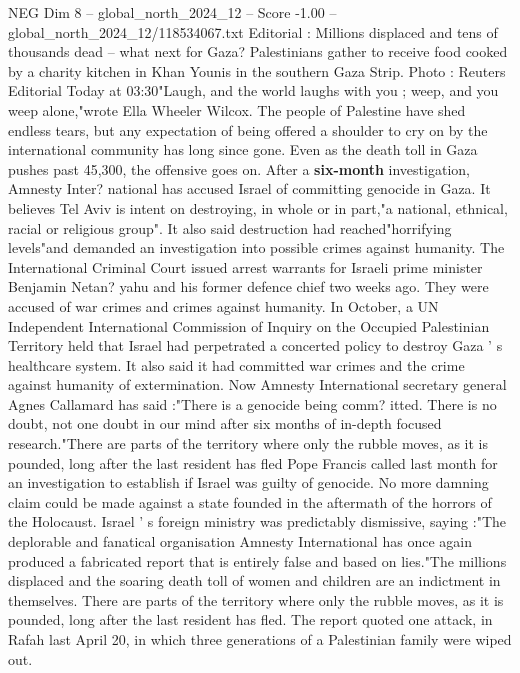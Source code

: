 \begin{textsample}{NEG Dim 8 – global\_north\_2024\_12 – Score -1.00 – global\_north\_2024\_12/118534067.txt}  \label{ex:f8_neg_354}
Editorial : Millions displaced and tens of thousands dead -- what next for Gaza?
Palestinians gather to receive food cooked by a charity kitchen in Khan Younis in the southern Gaza Strip.
Photo : Reuters Editorial Today at 03:30"Laugh, and the world laughs with you ; weep, and you weep alone,"wrote Ella Wheeler Wilcox.
The people of Palestine have shed endless tears, but any expectation of being offered a shoulder to cry on by the international community has long since gone.
Even as the death toll in Gaza pushes past 45,300, the offensive goes on.
After a \textbf{six-month} investigation, Amnesty Inter? national has accused Israel of committing genocide in Gaza.
It believes Tel Aviv is intent on destroying, in whole or in part,"a national, ethnical, racial or religious group".
It also said destruction had reached"horrifying levels"and demanded an investigation into possible crimes against humanity.
The International Criminal Court issued arrest warrants for Israeli prime minister Benjamin Netan? yahu and his former defence chief two weeks ago.
They were accused of war crimes and crimes against humanity.
In October, a UN Independent International Commission of Inquiry on the Occupied Palestinian Territory held that Israel had perpetrated a concerted policy to destroy Gaza ' s healthcare system.
It also said it had committed war crimes and the crime against humanity of extermination.
Now Amnesty International secretary general Agnes Callamard has said :"There is a genocide being comm? itted.
There is no doubt, not one doubt in our mind after six months of in-depth focused research."There are parts of the territory where only the rubble moves, as it is pounded, long after the last resident has fled Pope Francis called last month for an investigation to establish if Israel was guilty of genocide.
No more damning claim could be made against a state founded in the aftermath of the horrors of the Holocaust.
Israel ' s foreign ministry was predictably dismissive, saying :"The deplorable and fanatical organisation Amnesty International has once again produced a fabricated report that is entirely false and based on lies."The millions displaced and the soaring death toll of women and children are an indictment in themselves.
There are parts of the territory where only the rubble moves, as it is pounded, long after the last resident has fled.
The report quoted one attack, in Rafah last April 20, in which three generations of a Palestinian family were wiped out.

\end{textsample}
